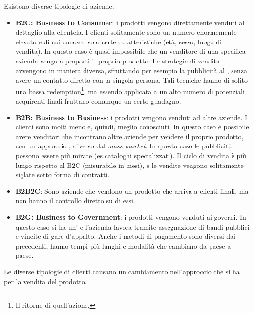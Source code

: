 Esistono diverse tipologie di aziende:
\begin{itemize}
  \item \textbf{B2C: Business to Consumer}: i prodotti vengono direttamente
  venduti al dettaglio alla clientela. I clienti solitamente sono un numero
  enormemente elevato e di cui conosco solo certe caratteristiche (età, sesso,
  luogo di vendita). In questo caso è quasi impossibile che un venditore di una
  specifica azienda venga a proporti il proprio prodotto. Le strategie di
  vendita avvengono in maniera diversa, sfruttando per esempio la pubblicità al
  , senza avere un contatto diretto con la singola 
  persona.
  Tali tecniche hanno di solito una bassa redemption\footnote{Il ritorno di
  quell'azione.}, ma essendo applicata a un alto numero di potenziali
  acquirenti finali fruttano comunque un certo guadagno.

  \item \textbf{B2B: Business to Business}: i prodotti vengono venduti ad altre
  aziende. I clienti sono molti meno e, quindi, meglio conosciuti. In questo
  caso è possibile avere venditori che incontrano altre aziende per vendere il
  proprio prodotto, con un approccio , diverso dal
  \textit{mass market}. In questo caso le pubblicità possono essere più mirate
  (es cataloghi specializzati). Il ciclo di vendita è più lungo rispetto al B2C
  (misurabile in mesi), e le vendite vengono solitamente siglate sotto forma di
  contratti.

  \item \textbf{B2B2C}: Sono aziende che vendono un prodotto che arriva a
  clienti finali, ma non hanno il controllo diretto su di essi.

  \item \textbf{B2G: Business to Government}: i prodotti vengono venduti ai
  governi. In questo caso si ha un' e l'azienda lavora tramite assegnazione di bandi pubblici e 
  vincite di gare d'appalto. Anche i metodi di pagamento sono diversi dai 
  precedenti, hanno tempi più lunghi e modalità che cambiano da paese a paese.
\end{itemize}

Le diverse tipologie di clienti causano un cambiamento nell'approccio che si ha
per la vendita del prodotto.
